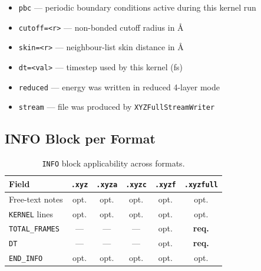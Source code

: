 \documentclass[12pt, a4paper, oneside]{article}
\newcommand{\type}[1]{\texttt{#1}}
\begin{document}
\begin{itemize}

  \item \texttt{pbc} --- periodic boundary conditions active during this kernel run

  \item \texttt{cutoff=<r>} --- non-bonded cutoff radius in \AA{}

  \item \texttt{skin=<r>} --- neighbour-list skin distance in \AA{}

  \item \texttt{dt=<val>} --- timestep used by this kernel (fs)

  \item \texttt{reduced} --- energy was written in reduced 4-layer mode

  \item \texttt{stream} --- file was produced by \type{XYZFullStreamWriter}

\end{itemize}


\subsection{INFO Block per Format}


\begin{table}[htbp]

  \centering

  \caption{\texttt{INFO} block applicability across formats.}

  \label{tab:info_formats}

  \begin{tabular}{lccccc}

    \toprule

    Field & \texttt{.xyz} & \texttt{.xyza} & \texttt{.xyzc} & \texttt{.xyzf} & \texttt{.xyzfull} \\

    \midrule

    Free-text notes       & opt. & opt. & opt. & opt. & opt. \\

    \texttt{KERNEL} lines & opt. & opt. & opt. & opt. & opt. \\

    \texttt{TOTAL\_FRAMES}& ---  & ---  & ---  & opt. & \textbf{req.} \\

    \texttt{DT}           & ---  & ---  & ---  & opt. & \textbf{req.} \\

    \texttt{END\_INFO}    & opt. & opt. & opt. & opt. & opt. \\

    \bottomrule

  \end{tabular}

\end{table}
\end{document}

